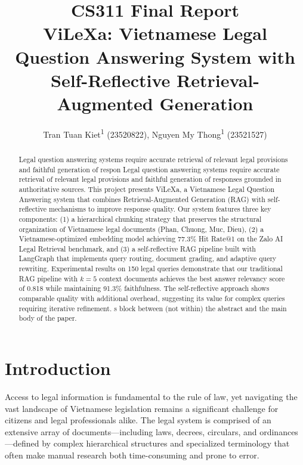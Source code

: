 \documentclass[letterpaper]{article} %
\title{CS311 Final Report \\ 
ViLeXa: Vietnamese Legal Question Answering System with \\ Self-Reflective Retrieval-Augmented Generation}
\author{
    Tran Tuan Kiet\textsuperscript{\rm 1} (23520822),
    Nguyen My Thong\textsuperscript{\rm 1}  (23521527)
}
\begin{document}
\maketitle

\begin{abstract}
Legal question answering systems require accurate retrieval of relevant legal provisions and faithful generation of respon	Legal question answering systems require accurate retrieval of relevant legal provisions and faithful generation of responses grounded in authoritative sources. This project presents ViLeXa, a Vietnamese Legal Question Answering system that combines Retrieval-Augmented Generation (RAG) with self-reflective mechanisms to improve response quality. Our system features three key components: (1) a hierarchical chunking strategy that preserves the structural organization of Vietnamese legal documents (Phan, Chuong, Muc, Dieu), (2) a Vietnamese-optimized embedding model achieving 77.3\% Hit Rate@1 on the Zalo AI Legal Retrieval benchmark, and (3) a self-reflective RAG pipeline built with LangGraph that implements query routing, document grading, and adaptive query rewriting. Experimental results on 150 legal queries demonstrate that our traditional RAG pipeline with $k=5$ context documents achieves the best answer relevancy score of 0.818 while maintaining 91.3\% faithfulness. The self-reflective approach shows comparable quality with additional overhead, suggesting its value for complex queries requiring iterative refinement.
s block between (not within) the abstract and the main body of the paper.
\end{abstract}
\begin{links}
\end{links}

\section{Introduction}

Access to legal information is fundamental to the rule of law, yet navigating the vast landscape of Vietnamese legislation remains a significant challenge for citizens and legal professionals alike. The legal system is comprised of an extensive array of documents—including laws, decrees, circulars, and ordinances—defined by complex hierarchical structures and specialized terminology that often make manual research both time-consuming and prone to error.
\end{document}
